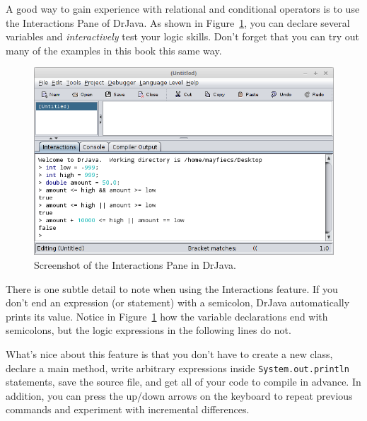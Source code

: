 \documentclass[12pt]{book}
\theoremstyle{exercise}
\newcommand{\java}[1]{\verb"#1"}
\newcommand{\java}[1]{\lstinline{#1}} %
\begin{document}
A good way to gain experience with relational and conditional operators is to use the Interactions Pane of DrJava.
As shown in Figure~\ref{fig:drjava}, you can declare several variables and {\it interactively} test your logic skills.
Don't forget that you can try out many of the examples in this book this same way.

%

\begin{figure}[!h]
\begin{center}
\includegraphics[width=\textwidth]{figs/drjava-logic.png}
\caption{Screenshot of the Interactions Pane in DrJava.}
\label{fig:drjava}
\end{center}
\end{figure}

There is one subtle detail to note when using the Interactions feature.
If you don't end an expression (or statement) with a semicolon, DrJava automatically prints its value.
Notice in Figure~\ref{fig:drjava} how the variable declarations end with semicolons, but the logic expressions in the following lines do not.

What's nice about this feature is that you don't have to create a new class, declare a main method, write arbitrary expressions inside \java{System.out.println} statements, save the source file, and get all of your code to compile in advance.
In addition, you can press the up/down arrows on the keyboard to repeat previous commands and experiment with incremental differences.

\end{document}
